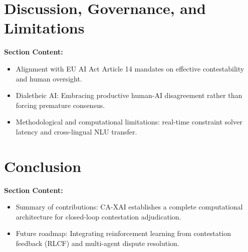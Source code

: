 \documentclass[preprint,12pt,3p,times]{elsarticle}
\begin{document}
\section{Discussion, Governance, and Limitations}
\label{sec:discussion}

\textbf{Section Content:}
\begin{itemize}
    \item Alignment with EU AI Act Article 14 mandates on effective contestability and human oversight.
    \item Dialetheic AI: Embracing productive human-AI disagreement rather than forcing premature consensus.
    \item Methodological and computational limitations: real-time constraint solver latency and cross-lingual NLU transfer.
\end{itemize}

\section{Conclusion}
\label{sec:conclusion}

\textbf{Section Content:}
\begin{itemize}
    \item Summary of contributions: CA-XAI establishes a complete computational architecture for closed-loop contestation adjudication.
    \item Future roadmap: Integrating reinforcement learning from contestation feedback (RLCF) and multi-agent dispute resolution.
\end{itemize}



\end{document}

